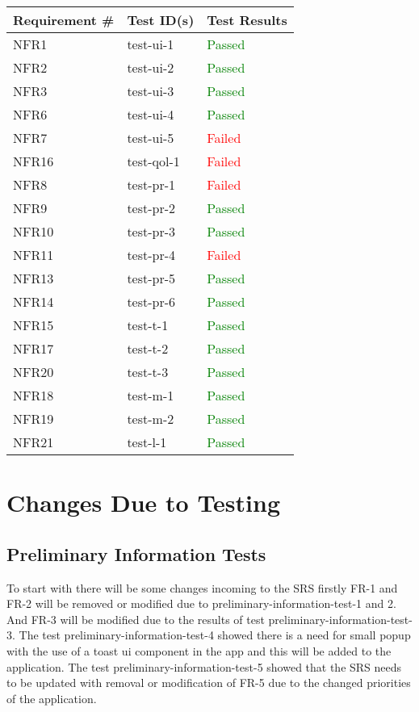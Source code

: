 \documentclass[12pt, titlepage]{article}
\begin{document}
\newpage
  \begin{table}[h!]
	
	\begin{tabular}{|p{3.5cm}|p{6.5cm}|p{4.5cm}|}

	\hline
	\textbf{Requirement \#} & \textbf{Test ID(s)}   &\textbf{Test Results}  \\ \hline
	NFR1 & test-ui-1 & \textcolor{green}{Passed} \\ \hline
	NFR2 & test-ui-2 & \textcolor{green}{Passed}   \\ \hline
	NFR3 & test-ui-3 & \textcolor{green}{Passed} \\ \hline
	NFR6 & test-ui-4 & \textcolor{green}{Passed} \\ \hline
	NFR7 & test-ui-5 & \textcolor{red}{Failed}  \\ \hline
	NFR16 & test-qol-1 & \textcolor{red}{Failed} \\ \hline
	NFR8 & test-pr-1 & \textcolor{red}{Failed}  \\ \hline
	NFR9 & test-pr-2 & \textcolor{green}{Passed} \\ \hline
	NFR10 & test-pr-3 & \textcolor{green}{Passed}\\ \hline
	NFR11 & test-pr-4 & \textcolor{red}{Failed} \\ \hline
	NFR13 & test-pr-5 & \textcolor{green}{Passed}\\ \hline
	NFR14 & test-pr-6 & \textcolor{green}{Passed}\\ \hline
	NFR15 & test-t-1 & \textcolor{green}{Passed}\\ \hline
	NFR17 & test-t-2 & \textcolor{green}{Passed}\\ \hline
	NFR20 & test-t-3 & \textcolor{green}{Passed}\\ \hline
	NFR18 & test-m-1 & \textcolor{green}{Passed}\\ \hline
	NFR19 & test-m-2 & \textcolor{green}{Passed}\\ \hline
	NFR21 & test-l-1 & \textcolor{green}{Passed}\\ \hline	
\end{tabular}
	
  \end{table}

\newpage

\section{Changes Due to Testing}

\subsection{Preliminary Information Tests}
To start with there will be some changes incoming to the SRS firstly FR-1 and FR-2 will be removed or modified due to 
preliminary-information-test-1 and 2. And FR-3 will be modified due to the results of test preliminary-information-test-3. 
The test preliminary-information-test-4 showed there is a need for small popup with the use of a toast ui component in the 
app and this will be added to the application. The test preliminary-information-test-5 showed that the SRS needs to be updated 
with removal or modification of FR-5 due to the changed priorities of the application.
\end{document}
